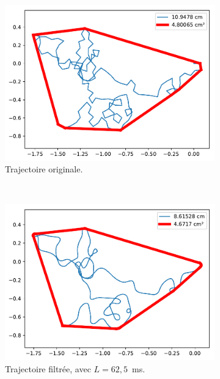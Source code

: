 	\begin{figure}[htbp]
		\begin{subfigure}[t]{0.49\textwidth}
			\centering
			\includegraphics[width=\textwidth]{figures/ch5/2_19_MovingAverage_2_19_120_32}
			\caption{Trajectoire originale.}
			\label{fig:movAvOriginal}
		\end{subfigure}
		~
		\begin{subfigure}[t]{0.49\textwidth}
			\centering
			\includegraphics[width=\textwidth]{figures/ch5/2_19_MovingAverage_2_19_120_32_window_62_5}
			\caption{Trajectoire filtrée, avec $L = 62,5$~ms.}
			\label{fig:movAv0625}
		\end{subfigure}
		~
		\begin{subfigure}[t]{0.49\textwidth}

\end{subfigure}
\end{figure}
